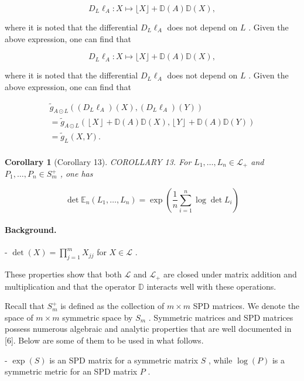 \documentclass[11pt]{article}
\newtheorem{corollary}{Corollary}
\begin{document}
$$
D _ {L} \ell_ {A}: X \mapsto \lfloor X \rfloor + \mathbb {D} (A) \mathbb {D} (X), \tag {3.2}
$$

where it is noted that the differential  $D_{L}\ell_{A}$  does not depend on  $L$ . Given the above expression, one can find that

$$
D _ {L} \ell_ {A}: X \mapsto \lfloor X \rfloor + \mathbb {D} (A) \mathbb {D} (X), \tag {3.2}
$$

where it is noted that the differential  $D_{L}\ell_{A}$  does not depend on  $L$ . Given the above expression, one can find that

$$
\begin{array}{l} \tilde {g} _ {A \odot L} ((D _ {L} \ell_ {A}) (X), (D _ {L} \ell_ {A}) (Y)) \\ = \tilde {g} _ {A \odot L} (\left\lfloor X \right\rfloor + \mathbb {D} (A) \mathbb {D} (X), \left\lfloor Y \right\rfloor + \mathbb {D} (A) \mathbb {D} (Y)) \\ = \tilde {g} _ {L} (X, Y). \\ \end{array}
$$


\begin{corollary}[Corollary 13]
COROLLARY 13. For  $L_{1},\ldots ,L_{n}\in \mathcal{L}_{+}$  and  $P_{1},\ldots ,P_{n}\in S_{m}^{+}$ , one has

$$
\det  \mathbb {E} _ {n} (L _ {1}, \dots , L _ {n}) = \exp \left(\frac {1}{n} \sum_ {i = 1} ^ {n} \log \det  L _ {i}\right) \tag {4.5}
$$
\end{corollary}

\paragraph{Background.}
-  $\operatorname{det}(X) = \prod_{j=1}^{m} X_{jj}$  for  $X \in \mathcal{L}$ .

These properties show that both  $\mathcal{L}$  and  $\mathcal{L}_{+}$  are closed under matrix addition and multiplication and that the operator  $\mathbb{D}$  interacts well with these operations.

Recall that  $S_{m}^{+}$  is defined as the collection of  $m \times m$  SPD matrices. We denote the space of  $m \times m$  symmetric space by  $S_{m}$ . Symmetric matrices and SPD matrices possess numerous algebraic and analytic properties that are well documented in [6]. Below are some of them to be used in what follows.

-  $\exp(S)$  is an SPD matrix for a symmetric matrix  $S$ , while  $\log(P)$  is a symmetric metric for an SPD matrix  $P$ .
\end{document}
